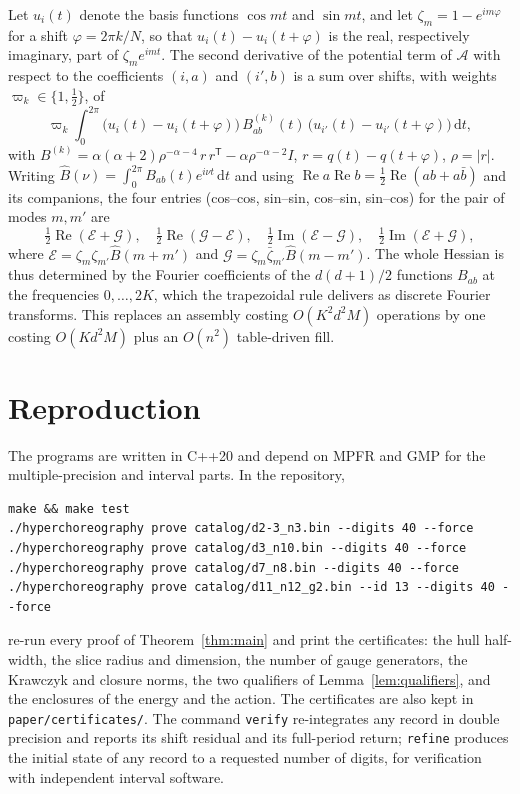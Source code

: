 \documentclass[11pt]{amsart}
\theoremstyle{definition}
\newcommand{\act}{\mathcal{A}}
\newcommand{\dd}{\,\mathrm{d}}
\begin{document}
Let $u_i(t)$ denote the basis functions $\cos mt$ and $\sin mt$, and let $\zeta_m=1-e^{im\varphi}$ for a shift $\varphi=2\pi k/N$, so that $u_i(t)-u_i(t+\varphi)$ is the real, respectively imaginary, part of $\zeta_me^{imt}$. The second derivative of the potential term of $\act$ with respect to the coefficients $(i,a)$ and $(i',b)$ is a sum over shifts, with weights $\varpi_k\in\{1,\tfrac12\}$, of
\[
\varpi_k\int_0^{2\pi}\big(u_i(t)-u_i(t+\varphi)\big)\,B^{(k)}_{ab}(t)\,\big(u_{i'}(t)-u_{i'}(t+\varphi)\big)\dd t,
\]
with $B^{(k)}=\alpha(\alpha+2)\rho^{-\alpha-4}\,r\,r^{\mathsf T}-\alpha\rho^{-\alpha-2}I$, $r=q(t)-q(t+\varphi)$, $\rho=|r|$. Writing $\hat B(\nu)=\int_0^{2\pi}B_{ab}(t)e^{i\nu t}\dd t$ and using $\operatorname{Re}a\operatorname{Re}b=\frac12\operatorname{Re}(ab+a\bar b)$ and its companions, the four entries (cos--cos, sin--sin, cos--sin, sin--cos) for the pair of modes $m,m'$ are
\[
\tfrac12\operatorname{Re}(\mathcal E+\mathcal G),\quad \tfrac12\operatorname{Re}(\mathcal G-\mathcal E),\quad \tfrac12\operatorname{Im}(\mathcal E-\mathcal G),\quad \tfrac12\operatorname{Im}(\mathcal E+\mathcal G),
\]
where $\mathcal E=\zeta_m\zeta_{m'}\hat B(m+m')$ and $\mathcal G=\zeta_m\bar\zeta_{m'}\hat B(m-m')$. The whole Hessian is thus determined by the Fourier coefficients of the $d(d+1)/2$ functions $B_{ab}$ at the frequencies $0,\dots,2K$, which the trapezoidal rule delivers as discrete Fourier transforms. This replaces an assembly costing $O(K^2d^2M)$ operations by one costing $O(Kd^2M)$ plus an $O(n^2)$ table-driven fill.

\section{Reproduction}\label{app:repro}

The programs are written in C++20 and depend on MPFR and GMP for the multiple-precision and interval parts. In the repository,
\begin{verbatim}
make && make test
./hyperchoreography prove catalog/d2-3_n3.bin --digits 40 --force
./hyperchoreography prove catalog/d3_n10.bin --digits 40 --force
./hyperchoreography prove catalog/d7_n8.bin --digits 40 --force
./hyperchoreography prove catalog/d11_n12_g2.bin --id 13 --digits 40 --force
\end{verbatim}
re-run every proof of Theorem~\ref{thm:main} and print the certificates: the hull half-width, the slice radius and dimension, the number of gauge generators, the Krawczyk and closure norms, the two qualifiers of Lemma~\ref{lem:qualifiers}, and the enclosures of the energy and the action. The certificates are also kept in \texttt{paper/certificates/}. The command \texttt{verify} re-integrates any record in double precision and reports its shift residual and its full-period return; \texttt{refine} produces the initial state of any record to a requested number of digits, for verification with independent interval software.



\end{document}
